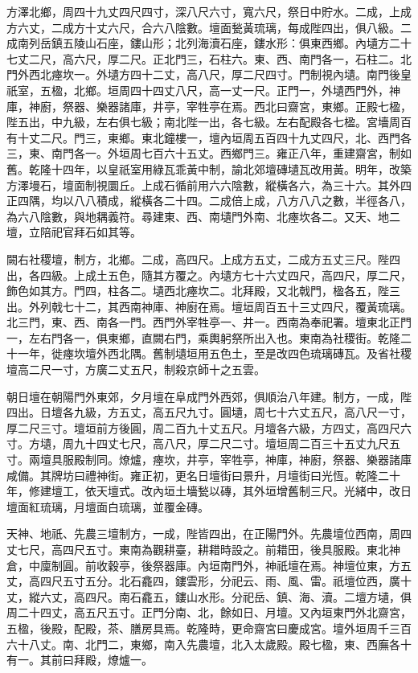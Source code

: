 \begin{pinyinscope}
方澤北鄉，周四十九丈四尺四寸，深八尺六寸，寬六尺，祭日中貯水。二成，上成方六丈，二成方十丈六尺，合六八陰數。壇面甃黃琉璃，每成陛四出，俱八級。二成南列岳鎮五陵山石座，鏤山形；北列海瀆石座，鏤水形：俱東西鄉。內壝方二十七丈二尺，高六尺，厚二尺。正北門三，石柱六。東、西、南門各一，石柱二。北門外西北瘞坎一。外壝方四十二丈，高八尺，厚二尺四寸。門制視內壝。南門後皇祇室，五楹，北鄉。垣周四十四丈八尺，高一丈一尺。正門一，外壝西門外，神庫，神廚，祭器、樂器諸庫，井亭，宰牲亭在焉。西北曰齋宮，東鄉。正殿七楹，陛五出，中九級，左右俱七級；南北陛一出，各七級。左右配殿各七楹。宮墻周百有十丈二尺。門三，東鄉。東北鐘樓一，壇內垣周五百四十九丈四尺，北、西門各三，東、南門各一。外垣周七百六十五丈。西鄉門三。雍正八年，重建齋宮，制如舊。乾隆十四年，以皇祇室用綠瓦乖黃中制，諭北郊壇磚壝瓦改用黃。明年，改築方澤墁石，壇面制視圜丘。上成石循前用六六陰數，縱橫各六，為三十六。其外四正四隅，均以八八積成，縱橫各二十四。二成倍上成，八方八八之數，半徑各八，為六八陰數，與地耦義符。尋建東、西、南壝門外南、北瘞坎各二。又天、地二壇，立陪祀官拜石如其等。

闕右社稷壇，制方，北鄉。二成，高四尺。上成方五丈，二成方五丈三尺。陛四出，各四級。上成土五色，隨其方覆之。內壝方七十六丈四尺，高四尺，厚二尺，飾色如其方。門四，柱各二。壝西北瘞坎二。北拜殿，又北戟門，楹各五，陛三出。外列戟七十二，其西南神庫、神廚在焉。壇垣周百五十三丈四尺，覆黃琉璃。北三門，東、西、南各一門。西門外宰牲亭一、井一。西南為奉祀署。壇東北正門一，左右門各一，俱東鄉，直闕右門，乘輿躬祭所出入也。東南為社稷街。乾隆二十一年，徙瘞坎壇外西北隅。舊制壝垣用五色土，至是改四色琉璃磚瓦。及省社稷壇高二尺一寸，方廣二丈五尺，制殺京師十之五雲。

朝日壇在朝陽門外東郊，夕月壇在阜成門外西郊，俱順治八年建。制方，一成，陛四出。日壇各九級，方五丈，高五尺九寸。圓壝，周七十六丈五尺，高八尺一寸，厚二尺三寸。壇垣前方後圓，周二百九十丈五尺。月壇各六級，方四丈，高四尺六寸。方壝，周九十四丈七尺，高八尺，厚二尺二寸。壇垣周二百三十五丈九尺五寸。兩壇具服殿制同。燎爐，瘞坎，井亭，宰牲亭，神庫，神廚，祭器、樂器諸庫咸備。其牌坊曰禮神街。雍正初，更名日壇街曰景升，月壇街曰光恆。乾隆二十年，修建壇工，依天壇式。改內垣土墻甃以磚，其外垣增舊制三尺。光緒中，改日壇面紅琉璃，月壇面白琉璃，並覆金磚。

天神、地祇、先農三壇制方，一成，陛皆四出，在正陽門外。先農壇位西南，周四丈七尺，高四尺五寸。東南為觀耕臺，耕耤時設之。前耤田，後具服殿。東北神倉，中廩制圓。前收穀亭，後祭器庫。內垣南門外，神祇壇在焉。神壇位東，方五丈，高四尺五寸五分。北石龕四，鏤雲形，分祀云、雨、風、雷。祇壇位西，廣十丈，縱六丈，高四尺。南石龕五，鏤山水形。分祀岳、鎮、海、瀆。二壇方壝，俱周二十四丈，高五尺五寸。正門分南、北，餘如日、月壇。又內垣東門外北齋宮，五楹，後殿，配殿，茶、膳房具焉。乾隆時，更命齋宮曰慶成宮。壇外垣周千三百六十八丈。南、北門二，東鄉，南入先農壇，北入太歲殿。殿七楹，東、西廡各十有一。其前曰拜殿，燎爐一。


\end{pinyinscope}

